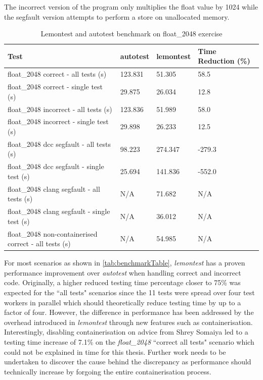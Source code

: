 \documentclass[hidelinks]{report}
\begin{document}
The incorrect version of the program only multiplies the float value by 1024 while the segfault version attempts to perform a store on unallocated memory.

\begin{table}[h]
	\centering
	\begin{tabular}{llll}
		\toprule
		\textbf{Test} & \textbf{autotest} & \textbf{lemontest} & \textbf{Time Reduction (\%)}\\
		\midrule
		float\_2048 correct - all tests (s)   	 & 123.831  & 51.305 & 58.5 \\
		float\_2048 correct - single test (s)    & 29.875  & 26.034 & 12.8 \\
		float\_2048 incorrect - all tests (s)    & 123.836  & 51.989 & 58.0 \\
		float\_2048 incorrect - single test (s)  & 29.898  & 26.233 &  12.5 \\
		float\_2048 dcc segfault - all tests (s)	 & 98.223  & 274.347 & -279.3 \\
		float\_2048 dcc segfault - single test (s)   & 25.694  & 141.836 & -552.0 \\
		float\_2048 clang segfault - all tests (s)	 & N/A  & 71.682 & N/A \\
		float\_2048 clang segfault - single test (s) & N/A  & 36.012 & N/A \\
		float\_2048 non-containerised correct - all tests (s) & N/A  & 54.985 & N/A \\
		\bottomrule
	\end{tabular}
	\caption{Lemontest and autotest benchmark on float\_2048 exercise}
	\label{tab:benchmarkTable}
\end{table}

For most scenarios as shown in \autoref{tab:benchmarkTable}, \textit{lemontest} has a proven performance improvement over \textit{autotest} when handling correct and incorrect code. Originally, a higher reduced testing time percentage closer to 75\% was expected for the ``all tests" scenarios since the 11 tests were spread over four test workers in parallel which should theoretically reduce testing time by up to a factor of four. However, the difference in performance has been addressed by the overhead introduced in \textit{lemontest} through new features such as containerisation. Interestingly, disabling containerisation on advice from Shrey Somaiya led to a testing time increase of 7.1\% on the \textit{float\_2048} ``correct all tests" scenario which could not be explained in time for this thesis. Further work needs to be undertaken to discover the cause behind the discrepancy as performance should technically increase by forgoing the entire containerisation process.
\end{document}
